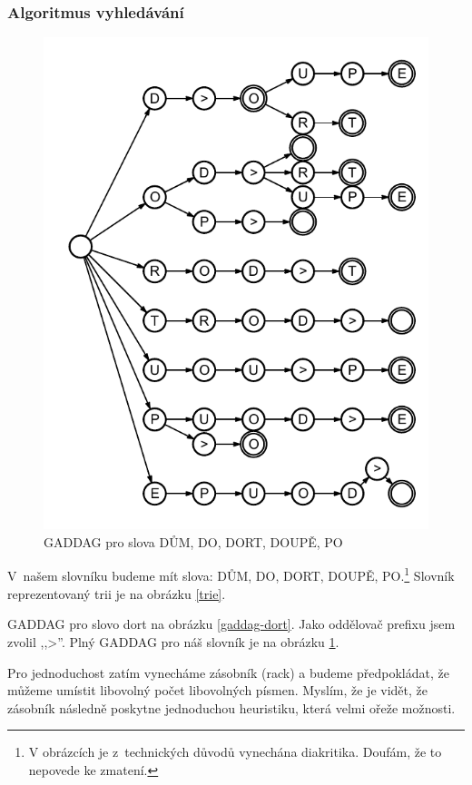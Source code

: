 \documentclass[a4paper]{article}
\begin{document}
\subsubsection{Algoritmus vyhledávání}
\begin{figure}[hb]
\centering
\includegraphics{pic/gaddag-all.pdf}
\caption{GADDAG pro slova DŮM, DO, DORT, DOUPĚ, PO}
\label{gaddag-all}
\end{figure}
V~našem slovníku budeme mít slova: DŮM, DO, DORT, DOUPĚ, PO.\footnote{V obrázcích je z~technických důvodů vynechána diakritika. Doufám, že to nepovede ke zmatení.} Slovník reprezentovaný trii je na obrázku \ref{trie}.

GADDAG pro slovo dort na obrázku \ref{gaddag-dort}. Jako oddělovač prefixu jsem zvolil ,,>''. Plný GADDAG pro náš slovník je na obrázku \ref{gaddag-all}.  


Pro jednoduchost zatím vynecháme zásobník (rack) a budeme předpokládat, že můžeme umístit libovolný počet libovolných písmen. Myslím, že je vidět, že zásobník následně poskytne jednoduchou heuristiku, která velmi ořeže možnosti.
\end{document}
